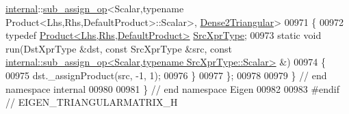 \begin{DoxyCode}
      \hyperlink{namespaceinternal}{internal}::\hyperlink{struct_eigen_1_1internal_1_1sub__assign__op}{sub\_assign\_op}<Scalar,typename Product<Lhs,Rhs,DefaultProduct>::Scalar>, 
      \hyperlink{struct_eigen_1_1internal_1_1_dense2_triangular}{Dense2Triangular}>
00971 \{
00972   \textcolor{keyword}{typedef} \hyperlink{group___core___module_class_eigen_1_1_product}{Product<Lhs,Rhs,DefaultProduct>} 
      \hyperlink{group___core___module_class_eigen_1_1_product}{SrcXprType};
00973   \textcolor{keyword}{static} \textcolor{keywordtype}{void} run(DstXprType &dst, \textcolor{keyword}{const} SrcXprType &src, \textcolor{keyword}{const} 
      \hyperlink{struct_eigen_1_1internal_1_1sub__assign__op}{internal::sub\_assign\_op<Scalar,typename SrcXprType::Scalar>}
       &)
00974   \{
00975     dst.\_assignProduct(src, -1, 1);
00976   \}
00977 \};
00978 
00979 \} \textcolor{comment}{// end namespace internal}
00980 
00981 \} \textcolor{comment}{// end namespace Eigen}
00982 
00983 \textcolor{preprocessor}{#endif // EIGEN\_TRIANGULARMATRIX\_H}
\end{DoxyCode}

